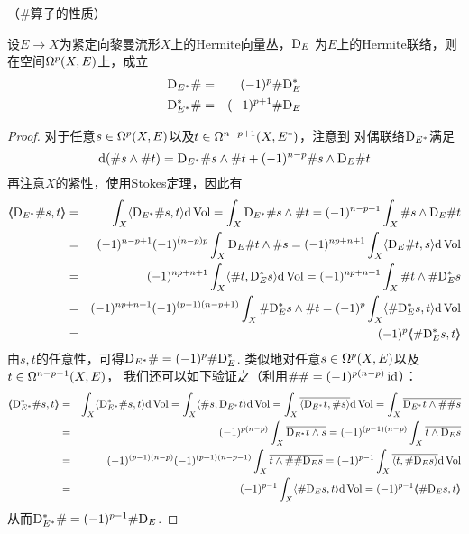 \begin{lemma}（$\#$算子的性质）
\label{井算子与Hermite联络}

设$E\to X$为紧定向黎曼流形$X$上的Hermite向量丛，$\mathrm{D}_E$
为$E$上的Hermite联络，则在空间$\Omega^p(X,E)$上，成立
\begin{eqnarray*}
\mathrm{D}_{E^*}\#   &=&  (-1)^p\#\mathrm{D}_E^*\\
\mathrm{D}_{E^*}^*\# &=&  (-1)^{p+1}\#\mathrm{D}_E
\end{eqnarray*}
\end{lemma}

\begin{proof}
对于任意$s\in\Omega^p(X,E)$以及$t\in\Omega^{n-p+1}(X,E^*)$，注意到
对偶联络$\mathrm{D}_{E^*}$满足
$$
  \mathrm{d}(\#s\wedge\#t)
=
  \mathrm{D}_{E^*}\#s\wedge\#t
  +(-1)^{n-p}\#s\wedge\mathrm{D}_E\#t
$$
再注意$X$的紧性，使用Stokes定理，因此有
\begin{eqnarray*}
     \ppair{\tD_{E^*}\#s}{t}
&=&
     \int_X\pair{\tD_{E^*}\#s}{t}\td\Vol
 =
     \int_X
       \tD_{E^*}\#s\wedge\#t
 =
     (-1)^{n-p+1}\int_X
       \#s\wedge\tD_E\#t\\
&=&
     (-1)^{n-p+1}(-1)^{(n-p)p}
     \int_X
       \tD_E\#t\wedge\#s
 =
     (-1)^{np+n+1}
     \int_X
       \pair{\tD_E\#t}{s}\td\Vol\\
&=&
     (-1)^{np+n+1}
     \int_X
       \pair{\#t}{\tD_E^*s}\td\Vol
 =
     (-1)^{np+n+1}
     \int_X
       \#t\wedge\#\tD_E^*s\\
&=&
     (-1)^{np+n+1}(-1)^{(p-1)(n-p+1)}
     \int_X
       \#\tD_E^*s\wedge\#t
 =
     (-1)^p\int_X
       \pair{\#\tD_E^*s}{t}\td\Vol\\
&=&
     (-1)^p\ppair{\#\tD_E^*s}{t}
\end{eqnarray*}
由$s,t$的任意性，可得$\mathrm{D}_{E^*}\#=(-1)^p\#\mathrm{D}_E^*$.
类似地对任意$s\in\Omega^p(X,E)$以及$t\in\Omega^{n-p-1}(X,E)$，
我们还可以如下验证之（利用$\#\#=(-1)^{p(n-p)}\operatorname{id}$）：
\begin{eqnarray*}
     \ppair{\tD_{E^*}^*\#s}{t}
&=&
     \int_X\pair{\tD_{E^*}^*\#s}{t}\td\Vol
 =
     \int_X\pair{\#s}{\tD_{E^*}t}\td\Vol
 =
     \int_X
     \overline{\pair{\tD_{E^*}t}{\#s}}\td\Vol
 =
     \int_X
     \overline{\tD_{E^*}t\wedge\#\#s}\\
&=&
     (-1)^{p(n-p)}\int_X
     \overline{\tD_{E^*}t\wedge s}
 =
     (-1)^{(p-1)(n-p)}
     \int_X
     \overline{t\wedge\tD_E s}\\
&=&
     (-1)^{(p-1)(n-p)}(-1)^{(p+1)(n-p-1)}
     \int_X\overline{t\wedge\#\#\tD_Es}
 =
     (-1)^{p-1}\int_X
     \overline{\pair{t}{\#\tD_Es}}\td\Vol\\
&=&
     (-1)^{p-1}\int_X
     \pair{\#\tD_Es}{t}\td\Vol
 =
      (-1)^{p-1}
      \ppair{\#\tD_Es}{t}
\end{eqnarray*}
从而$\mathrm{D}_{E^*}^*\#=(-1)^{p-1}\#\mathrm{D}_E$.
\end{proof}

